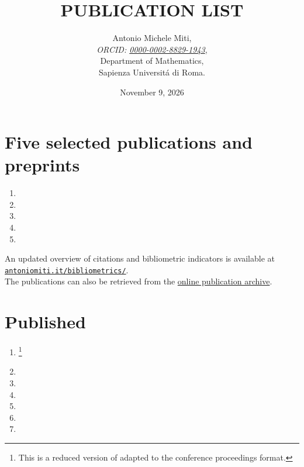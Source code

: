 \documentclass[a4paper]{article}
\title{PUBLICATION LIST}
\date{November 9, 2026}
\author{
  Antonio Michele Miti,\\
  \emph{ORCID: \href{https://orcid.org/0000-0002-8829-1943}{0000-0002-8829-1943}},\\
  Department of Mathematics,\\
  Sapienza Universit\'a di Roma.
}
\begin{document}
\section*{Five selected publications and preprints}
\begin{enumerate}
\item {}
\item {}
\item {}
\item {}
\item {}
\end{enumerate}
\newpage


\maketitle

\noindent
An updated overview of citations and bibliometric indicators is available at
\href{https://antoniomiti.it/bibliometrics/}{\texttt{antoniomiti.it/bibliometrics/}}.
\\
The publications can also be retrieved from the
\href{https://www.dropbox.com/sh/asop74adf1c0gbi/AADDEeq-8XCf3IISOMzrlbroa?dl=0}{online publication archive}.

\section*{Published}

\begin{enumerate}
  \setcounter{enumi}{0}


  \item {}\footnote{This is a reduced version of \cite{Luongo2024} adapted to the conference proceedings format.}

  \item {}

  \item {}

  \item {}

  \item {}

  \item {}

  \item {}


\end{enumerate}
\end{document}
